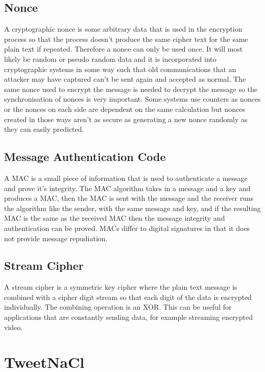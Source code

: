 \subsection{Nonce}

A cryptographic nonce is some arbitrary data that is used in the encryption process so that the process doesn't produce the same cipher text for the same plain text if repeated. Therefore a nonce can only be used once. It will most likely be random or pseudo random data and it is incorporated into cryptographic systems in some way such that old communications that an attacker may have captured can't be sent again and accepted as normal. The same nonce used to encrypt the message is needed to decrypt the message so the synchronisation of nonces is very important. Some systems use counters as nonces or the nonces on each side are dependent on the same calculation but nonces created in those ways aren't as secure as generating a new nonce randomly as they can easily predicted. 

\subsection{Message Authentication Code}

A MAC is a small piece of information that is used to authenticate a message and prove it's integrity. The MAC algorithm takes in a message and a key and produces a MAC, then the MAC is sent with the message and the receiver runs the algorithm like the sender, with the same message and key, and if the resulting MAC is the same as the received MAC then the message integrity and authentication can be proved. MACs differ to digital signatures in that it does not provide message repudiation.

\subsection{Stream Cipher}

A stream cipher is a symmetric key cipher where the plain text message is combined with a cipher digit stream so that each digit of the data is encrypted individually. The combining operation is an XOR. This can be useful for applications that are constantly sending data, for example streaming encrypted video. 

\section{TweetNaCl}

